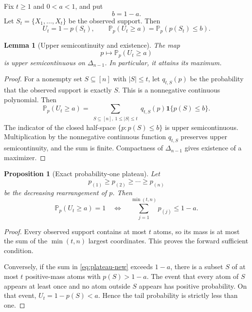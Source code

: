 \documentclass[11pt]{article}
\theoremstyle{plain}
\newtheorem{proposition}[theorem]{Proposition}
\newtheorem{lemma}[theorem]{Lemma}
\theoremstyle{definition}
\theoremstyle{remark}
\newcommand{\PP}{\mathbb P}
\newcommand{\one}{\mathbf 1}
\newcommand{\simplex}{\Delta_{n-1}}
\begin{document}
Fix \(t\ge1\) and \(0<a<1\), and put
\[
b=1-a.
\]
Let \(S_t=\{X_1,\ldots,X_t\}\) be the observed support.  Then
\[
U_t=1-p(S_t),
\qquad
\PP_p(U_t\ge a)=\PP_p(p(S_t)\le b).
\]

\begin{lemma}[Upper semicontinuity and existence]\label{lem:tail-existence}
The map
\[
p\longmapsto\PP_p(U_t\ge a)
\]
is upper semicontinuous on \(\simplex\).  In particular, it attains its maximum.
\end{lemma}

\begin{proof}
For a nonempty set \(S\subseteq[n]\) with \(|S|\le t\), let \(q_{t,S}(p)\) be the probability that the observed support is exactly \(S\).  This is a nonnegative continuous polynomial.  Then
\begin{equation}\label{eq:tail-support-sum}
\PP_p(U_t\ge a)
=\sum_{\substack{S\subseteq[n],\ 1\le|S|\le t}}
q_{t,S}(p)\one\{p(S)\le b\}.
\end{equation}
The indicator of the closed half-space \(\{p:p(S)\le b\}\) is upper semicontinuous.  Multiplication by the nonnegative continuous function \(q_{t,S}\) preserves upper semicontinuity, and the sum is finite.  Compactness of \(\simplex\) gives existence of a maximizer.
\end{proof}

\begin{proposition}[Exact probability-one plateau]\label{prop:plateau-new}
Let
\[
p_{(1)}\ge p_{(2)}\ge\cdots\ge p_{(n)}
\]
be the decreasing rearrangement of \(p\).  Then
\begin{equation}\label{eq:plateau-new}
\PP_p(U_t\ge a)=1
\quad\Longleftrightarrow\quad
\sum_{j=1}^{\min(t,n)}p_{(j)}\le1-a.
\end{equation}
\end{proposition}

\begin{proof}
Every observed support contains at most \(t\) atoms, so its mass is at most the sum of the \(\min(t,n)\) largest coordinates.  This proves the forward sufficient condition.

Conversely, if the sum in \eqref{eq:plateau-new} exceeds \(1-a\), there is a subset \(S\) of at most \(t\) positive-mass atoms with \(p(S)>1-a\).  The event that every atom of \(S\) appears at least once and no atom outside \(S\) appears has positive probability.  On that event, \(U_t=1-p(S)<a\).  Hence the tail probability is strictly less than one.
\end{proof}
\end{document}
